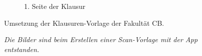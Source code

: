 \documentclass[nomenclature, oneside, 150]{HSMW-Thesis}
\begin{document}
\begin{figure}[th]
\begin{subfigure}[t]{0.4\textwidth}
        			\caption{1. Seite der Klausur}
        			\label{fig:seite2}
    			\end{subfigure}
    			\caption{Umsetzung der Klausuren-Vorlage der Fakultät CB.}
    			\caption*{\textit{Die Bilder sind beim Erstellen einer Scan-Vorlage mit der App entstanden.}}
    			\label{fig:klausur}
			\end{figure}
	
\end{document}

